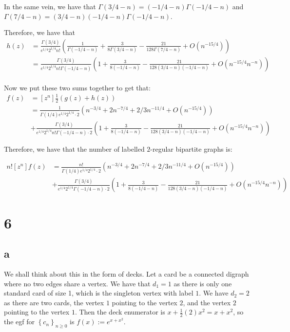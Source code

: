 \documentclass[]{article}
\begin{document}
In the same vein, we have that $\Gamma(3/4 - n) = (-1/4 - n)\Gamma(-1/4 - n)$ and $\Gamma(7/4 - n) = (3/4 - n)(-1/4 - n) \Gamma(-1/4 - n)$. 

Therefore, we have that
\begin{align*}
	[z^n] h(z) &= \frac{\Gamma(3/4)}{e^{1/4} 2^{1/4} n!} \left(\frac{1}{\Gamma(-1/4 - n)}+ \frac{3}{8 \Gamma(3/4 - n)} - \frac{21}{128 \Gamma(7/4 - n)}+  O(n^{-15/4})\right)\\
	&= 
	\frac{\Gamma(3/4)}{e^{1/4} 2^{1/4} n! \Gamma(-1/4 - n)} \left(1+ \frac{3}{8 (-1/4 - n)} - \frac{21}{128 (3/4 - n)(-1/4 - n)}+  O(n^{-15/4} n^{-n})\right)\\
\end{align*}

Now we put these two sums together to get that:
\begin{align*}
	[z^n] f(z) &= [z^n] \frac{1}{2} \left(g(z) + h(z)\right)\\
	&=
	\frac{1}{\Gamma(1/4) e^{1/4} 2^{1/4} \cdot 2}\left( n^{-3/4} +  2 n^{-7/4} + 2/3 n^{-11/4} + O(n^{-15/4}) \right)\\ 
	&+
	\frac{\Gamma(3/4)}{e^{1/4} 2^{1/4} n! \Gamma(-1/4 - n) \cdot 2} \left(1+ \frac{3}{8 (-1/4 - n)} - \frac{21}{128 (3/4 - n)(-1/4 - n)}+  O(n^{-15/4} n^{-n})\right)
\end{align*}


Therefore, we have that the number of labelled $2$-regular bipartite graphs is:

\begin{align}
	n! [z^n] f(z)&=
\frac{n!}{\Gamma(1/4) e^{1/4} 2^{1/4} \cdot 2}\left( n^{-3/4} +  2 n^{-7/4} + 2/3 n^{-11/4} + O(n^{-15/4}) \right)\\ 
&+
\frac{\Gamma(3/4)}{e^{1/4} 2^{1/4} \Gamma(-1/4 - n) \cdot 2}  \left(1+ \frac{3}{8 (-1/4 - n)} - \frac{21}{128 (3/4 - n)(-1/4 - n)}+  O(n^{-15/4} n^{-n})\right)
\end{align}

\section{6}
\subsection{a}
We shall think about this in the form of decks. Let a card be a connected digraph where no two edges share a vertex. We have that $d_1 = 1$ as there is only one standard card of size 1, which is the singleton vertex with label $1$. We have $d_2 = 2$ as there are two cards, the vertex $1$ pointing to the vertex $2$, and the vertex $2$ pointing to the vertex $1$. Then the deck enumerator is $x + \frac{1}{2} (2) x^2 = x + x^2$, so the egf for $\left\{ c_n\right\}_{n \geq 0}$ is $f(x) := e^{x + x^2}$.
\end{document}
